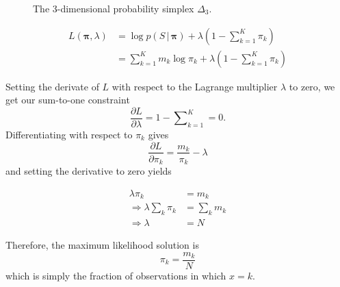 \documentclass[final,3p,times,twocolumn]{elsarticle}
\let\bs\boldsymbol
\begin{document}
\begin{figure}
\caption{The 3-dimensional probability simplex $\Delta_3$.}
\label{fig:simplex}
\end{figure}

\begin{equation*}
\begin{split}
L(\bs \pi, \lambda) &= \log p(S\,|\,\bs \pi) + \lambda\left(1 - \sum \nolimits_{k=1}^K \pi_k\right)\\
&= \sum\nolimits_{k=1}^K m_k \log \pi_k + \lambda\left(1-\sum\nolimits_{k=1}^K \pi_k\right)
\end{split}
\end{equation*}

Setting the derivate of $L$ with respect to the Lagrange multiplier $\lambda$ to zero, we get our sum-to-one constraint
\begin{equation}
\label{dldlambda}
\frac{\partial L}{\partial \lambda} = 1 - \sum\nolimits_{k=1}^K = 0.
\end{equation}
Differentiating with respect to $\pi_k$ gives
\begin{equation}
\frac{\partial L}{\partial \pi_k} = \frac{m_k}{\pi_k} - \lambda
\end{equation}
and setting the derivative to zero yields

\begin{equation}
\label{dldpi}
\begin{split}
\lambda \pi_k &= m_k\\
\Rightarrow \lambda \sum\nolimits_k \pi_k &= \sum\nolimits_k m_k\\
\Rightarrow \lambda &= N
\end{split}
\end{equation}

Therefore, the maximum likelihood solution is 
\begin{equation}
\label{eqn:catML}
\pi_k = \frac{m_k}{N}
\end{equation}
which is simply the fraction of observations in which $x = k$.
\end{document}
